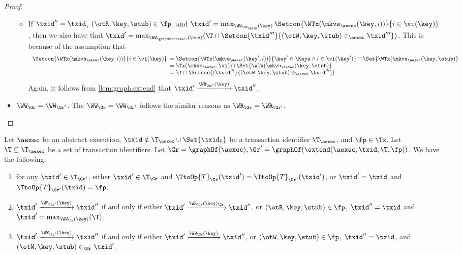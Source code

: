 \begin{proof}
\begin{itemize}
\begin{itemize}
\item If $\txid'' = \txid$, $(\otR, \key, \stub) \in \fp$, and $\txid' = \max_{\WW_{\Gr_\mkvs}(\key)} \Setcon{ \WTx(\mkvs_{\aexec}(\key, i)) }{ i \in \vi(\key)}$, 
    then we also have that $\txid' = \max_{\WW_{\graphOf(\aexec)}(\key)} (\T \cap \Setcon{ \txid''' }{ (\otW, \key, \stub) \in_{\aexec} \txid'''}) $. 
This is because of the assumption that 
\[
\begin{array}{l}
    \Setcon{\WTx(\mkvs_{\aexec}(\key, i)) }{ i \in \vi(\key)}
    \begin{array}[t]{l}
    = \Setcon{\WTx(\mkvs_{\aexec}(\key', i)) }{ \key' \in \Keys \wedge i \in \vi(\key')} \cap \Set{\WTx(\mkvs_{\aexec}(\key, \stub)} \\
= \Tx(\mkvs_{\aexec}, \vi) \cap \Set{\WTx(\mkvs_{\aexec}(\key, \stub)}  \\
= \T \cap \Setcon{(\txid''' }{ (\otW, \key, \stub) \in_{\aexec} \txid''')}
\end{array}
\end{array}
\]
Again, it follows from \cref{lem:graph.extend} that $\txid' \xrightarrow{\WR_{\Gr'}(\key)} \txid''$. 
\end{itemize}
\item \( \WW_{\Gr} = \WW_{\Gr'}\). The \( \WW_{\Gr} = \WW_{\Gr'} \) follows the similar reasons as $\WR_{\Gr} = \WR_{\Gr'}$.
\end{itemize}
\end{proof}

\begin{lemma}
\label{lem:graph.extend}
Let $\aexec$ be an abstract execution, 
$\txid \notin \T_{\aexec} \cup \Set{\txid_0}$ be a transaction identifier $\T_{\aexec}$, and $\fp \in \Tx$. 
Let $\T \subseteq \T_{\aexec}$ be a set of transaction identifiers.
Let $\Gr = \graphOf(\aexec), \Gr' = \graphOf(\extend(\aexec, \txid, \T, \fp))$. 
We have the following: 
\begin{enumerate}
\item for any $\txid' \in \T_{\Gr'}$, either $\txid' \in \T_{\Gr}$ and $\TtoOp{T}_{\Gr}(\txid') = \TtoOp{T}_{\Gr'}(\txid')$, 
or $\txid' = \txid$ and $\TtoOp{T}_{\Gr'}(\txid) = \fp$.
\item $\txid' \xrightarrow{\WR_{\Gr'}(\key)} \txid''$ if and only if either 
$\txid' \xrightarrow{\WR_{\Gr}(\key)_{\Gr}} \txid''$, or $(\otR, \key, \stub) \in \fp$, $\txid'' = \txid$ and 
$\txid' = \max_{\WW_{\Gr}(\key)}(\T)$, 
\item $\txid' \xrightarrow{\WW_{\Gr'}(\key)} \txid''$ if and only if 
either $\txid' \xrightarrow{\WW_{\Gr}(\key)} \txid''$, or $(\otW, \key, \stub) \in \fp$, $\txid'' = \txid$, 
and $(\otW, \key, \stub) \in_{\Gr} \txid'$.
\end{enumerate}
\end{lemma}

